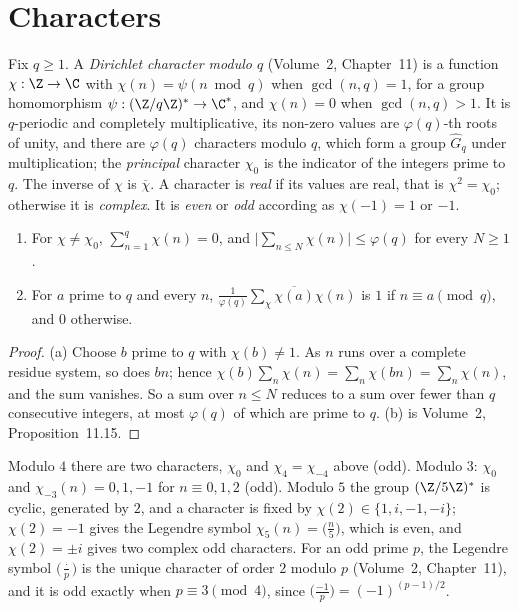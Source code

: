 \section{Characters}

Fix $q\ge1$. A \emph{Dirichlet character modulo $q$} (Volume~2, Chapter~11) is a function $\chi:\Z\to\C$ with $\chi(n)=\psi(n\bmod q)$ when $\gcd(n,q)=1$, for a
group homomorphism $\psi:(\Z/q\Z)^*\to\C^*$, and $\chi(n)=0$ when $\gcd(n,q)>1$. It is $q$-periodic and completely multiplicative, its non-zero
values are $\varphi(q)$-th roots of unity, and there are $\varphi(q)$ characters modulo $q$, which form a group $\widehat G_q$ under multiplication; the
\emph{principal} character $\chi_0$ is the indicator of the integers prime to $q$. The inverse of $\chi$ is $\overline\chi$. A character is \emph{real} if
its values are real, that is $\chi^2=\chi_0$; otherwise it is \emph{complex}. It is \emph{even} or \emph{odd} according as $\chi(-1)=1$ or $-1$.

\begin{proposition}[orthogonality]\label{prop:orth}
\begin{enumerate}[label=(\alph*)]
\item For $\chi\ne\chi_0$, $\sum_{n=1}^q\chi(n)=0$, and $\bigl|\sum_{n\le N}\chi(n)\bigr|\le\varphi(q)$ for every $N\ge1$.
\item For $a$ prime to $q$ and every $n$, $\frac1{\varphi(q)}\sum_\chi\overline{\chi(a)}\chi(n)$ is $1$ if $n\equiv a\pmod q$, and $0$ otherwise.
\end{enumerate}
\end{proposition}
\begin{proof}
(a) Choose $b$ prime to $q$ with $\chi(b)\ne1$. As $n$ runs over a complete residue system, so does $bn$; hence
$\chi(b)\sum_n\chi(n)=\sum_n\chi(bn)=\sum_n\chi(n)$, and the sum vanishes. So a sum over $n\le N$ reduces to a sum over fewer than $q$
consecutive integers, at most $\varphi(q)$ of which are prime to $q$.
(b) is Volume~2, Proposition~11.15.
\end{proof}

\begin{example}\label{ex:smallchars}
Modulo $4$ there are two characters, $\chi_0$ and $\chi_4=\chi_{-4}$ above (odd). Modulo $3$: $\chi_0$ and $\chi_{-3}(n)=0,1,-1$ for $n\equiv0,1,2$ (odd). Modulo $5$
the group $(\Z/5\Z)^*$ is cyclic, generated by $2$, and a character is fixed by $\chi(2)\in\{1,i,-1,-i\}$; $\chi(2)=-1$ gives the Legendre symbol
$\chi_5(n)=\bigl(\frac n5\bigr)$, which is even, and $\chi(2)=\pm i$ gives two complex odd characters. For an odd prime $p$, the Legendre symbol
$\bigl(\frac\cdot p\bigr)$ is the unique character of order $2$ modulo $p$ (Volume~2, Chapter~11), and it is odd exactly when $p\equiv3\pmod4$, since
$\bigl(\frac{-1}p\bigr)=(-1)^{(p-1)/2}$.
\end{example}

